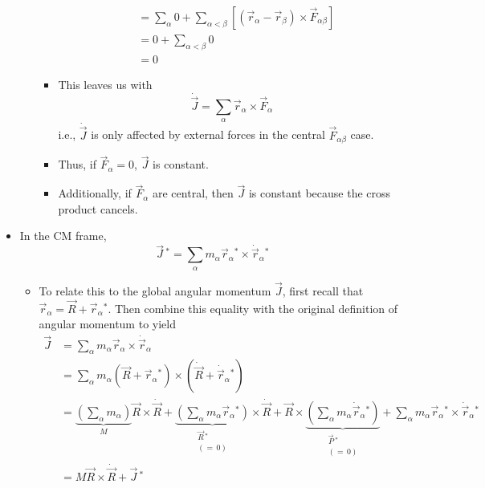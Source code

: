 \documentclass[../notes.tex]{subfiles}
\begin{document}
\begin{itemize}
\begin{itemize}
\begin{itemize}
\begin{align*}
                &= \sum_\alpha 0+\sum_{\alpha<\beta}[(\vec{r}_\alpha-\vec{r}_\beta)\times\vec{F}_{\alpha\beta}]\\
                &= 0+\sum_{\alpha<\beta}0\\
                &= 0
            \end{align*}
            \item This leaves us with
            \begin{equation*}
                \dot{\vec{J}} = \sum_\alpha\vec{r}_\alpha\times\vec{F}_\alpha
            \end{equation*}
            i.e., $\dot{\vec{J}}$ is only affected by external forces in the central $\vec{F}_{\alpha\beta}$ case.
            \item Thus, if $\vec{F}_\alpha=0$, $\vec{J}$ is constant.
            \item Additionally, if $\vec{F}_\alpha$ are central, then $\vec{J}$ is constant because the cross product cancels.
        \end{itemize}
    \end{itemize}
    \item In the CM frame,
    \begin{equation*}
        \vec{J}{\,}^* = \sum_\alpha m_\alpha\vec{r}_\alpha{}^*\times\dot{\vec{r}}_\alpha{}^*
    \end{equation*}
    \begin{itemize}
        \item To relate this to the global angular momentum $\vec{J}$, first recall that $\vec{r}_\alpha=\vec{R}+\vec{r}_\alpha{}^*$. Then combine this equality with the original definition of angular momentum to yield
        \begin{align*}
            \vec{J} &= \sum_\alpha m_\alpha\vec{r}_\alpha\times\dot{\vec{r}}_\alpha\\
            &= \sum_\alpha m_\alpha(\vec{R}+\vec{r}_\alpha{}^*)\times(\dot{\vec{R}}+\dot{\vec{r}}_\alpha{}^*)\\
            &= \underbrace{\left( \sum_\alpha m_\alpha \right)}_M\vec{R}\times\dot{\vec{R}}+\underbrace{\left( \sum_\alpha m_\alpha\vec{r}_\alpha{}^* \right)}_{\substack{\vec{R}{\,}^*\\(=\,0)}}\times\dot{\vec{R}}+\vec{R}\times\underbrace{\left( \sum_\alpha m_\alpha\dot{\vec{r}}_\alpha{}^* \right)}_{\substack{\vec{P}{\,}^*\\(=\,0)}}+\sum_\alpha m_\alpha\vec{r}_\alpha{}^*\times\dot{\vec{r}}_\alpha{}^*\\
            &= M\vec{R}\times\dot{\vec{R}}+\vec{J}{\,}^*

\end{align*}
\end{itemize}
\end{itemize}
\end{document}

